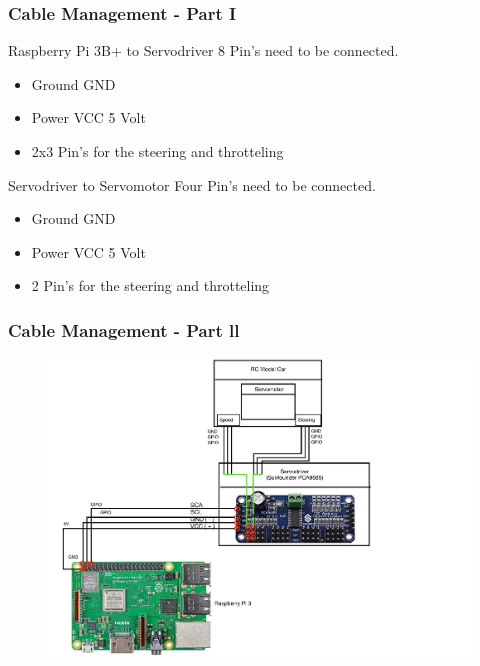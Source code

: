 \documentclass{beamer}
\begin{document}
%
%
\begin{frame}
\frametitle{Cable Management - Part I}
\begin{block}{Raspberry Pi 3B+ to Servodriver}
8 Pin's need to be connected. 
\begin{itemize}
\item Ground GND
\item Power VCC 5 Volt
\item 2x3 Pin's for the steering and throtteling
\end{itemize}
\end{block}
\begin{block}{Servodriver to Servomotor}
Four Pin's need to be connected. 
\begin{itemize}
\item Ground GND
\item Power VCC 5 Volt
\item 2 Pin's for the steering and throtteling
\end{itemize}
\end{block}
\end{frame}
%
%
\begin{frame}
\frametitle{Cable Management - Part ll}
\begin{figure}
\includegraphics[width=0.7\linewidth]{photo/ebene2.pdf}
\end{figure}
\end{frame}
%
\end{document}
